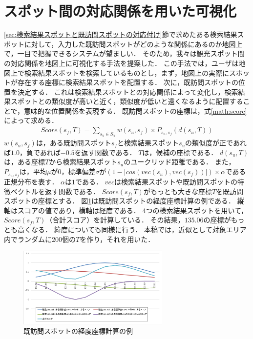 \documentclass{deimj}
\begin{document}
\section{スポット間の対応関係を用いた可視化}
\label{sec:検索結果スポットと既訪問スポットの対応関係を用いた可視化}
\ref{sec:検索結果スポットと既訪問スポットの対応付け}節で求めたある検索結果スポットに対して，入力した既訪問スポットがどのような関係にあるのか地図上で，一目で把握できるシステムが望ましい．
そのため，我々は観光スポット間の対応関係を地図上に可視化する手法\cite{潘STI}を提案した．
この手法では，ユーザは地図上で検索結果スポットを検索しているものとし，まず，地図上の実際にスポットが存在する座標に検索結果スポットを配置する．
次に，既訪問スポットの位置を決定する．
これは検索結果スポットとの対応関係によって変化し，検索結果スポットとの類似度が高いと近く，類似度が低いと遠くなるように配置することで，意味的な位置関係を表現する．
既訪問スポットの座標は，式\ref{math:score}によって求める．
\begin{eqnarray}
Score(s_f,T) = \sum_{s_u \in S_u}^{} w(s_u,s_f) \times P_{s_u,s_f}(d(s_u,T))
    \label{math:score}
\end{eqnarray}
$w(s_u,s_f)$は，ある既訪問スポット$s_f$と検索結果スポット$s_u$の類似度が正であれば$1.0$，負であれば$-0.5$を返す関数である．
$T$は，候補の座標である．
$d(s_u,T)$は，ある座標$T$から検索結果スポット$s_u$のユークリッド距離である．
また，$P_{s_u,s_f}$は，平均$\mu$が$0$，標準偏差$\sigma$が$(1-|cos(vec(s_u),vec(s_f))|) \times \alpha$である正規分布を表す．
$\alpha$は$1$である．
$vec$は検索結果スポットや既訪問スポットの特徴ベクトルを返す関数である．
$Score(s_f,T)$がもっとも大きな座標$T$を既訪問スポットの座標とする．
図\ref{fig:image}は既訪問スポットの経度座標計算の例である．
縦軸はスコアの値であり，横軸は経度である．
4つの検索結果スポットを用いて，$Score(s_f,T)$（合計スコア）を計算している．
その結果，$135.06$の座標がもっとも高くなる．
緯度についても同様に行う．
本稿では，近似として対象エリア内でランダムに200個の$T$を作り，それを用いた．
\begin{figure}[t]
  \begin{center}
    \includegraphics[clip,width=7.5cm]{picture/score_image2.png}
    \caption{既訪問スポットの経度座標計算の例}
    \label{fig:image}
  \end{center}
\end{figure}
\end{document}
